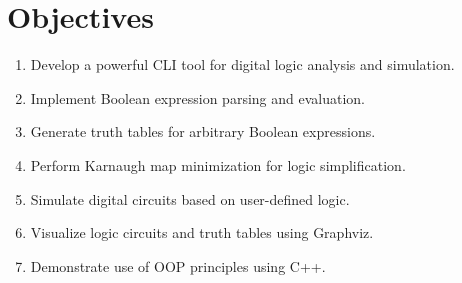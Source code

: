 \section{Objectives}
\renewcommand{\labelenumi}{\roman{enumi}.}
\begin{enumerate}
    \item Develop a powerful CLI tool for digital logic analysis and simulation.
    \item Implement Boolean expression parsing and evaluation.
    \item Generate truth tables for arbitrary Boolean expressions.
    \item Perform Karnaugh map minimization for logic simplification.
    \item Simulate digital circuits based on user-defined logic.
    \item Visualize logic circuits and truth tables using Graphviz.
    \item Demonstrate use of OOP principles using C++.
\end{enumerate}